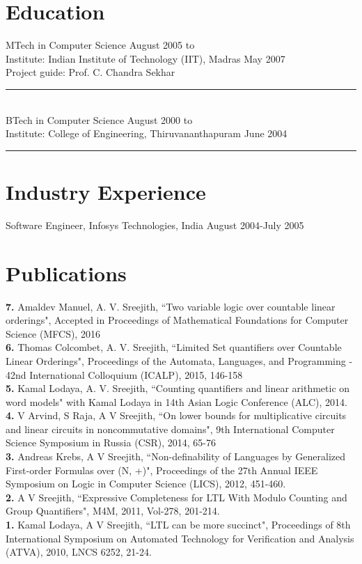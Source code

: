 \documentclass[margin]{res}
\begin{document}
\begin{resume}
\section{Education} 
					MTech in Computer Science \hfill August 2005 to \\
					Institute: Indian Institute of Technology (IIT), Madras \hfill May 2007 \\
					Project guide: Prof. C. Chandra Sekhar \\
					\noindent\rule{13cm}{0.4pt} \\
					BTech in Computer Science \hfill August 2000 to \\
					Institute: College of Engineering, Thiruvananthapuram \hfill June 2004 \\
					\noindent\rule{13cm}{0.4pt} 

\section{Industry Experience}
Software Engineer, Infosys Technologies, India \hfill August 2004-July 2005
 
\section{Publications}
{\bf 7.} Amaldev Manuel, A. V. Sreejith, ``Two variable logic over countable linear orderings", Accepted in Proceedings of Mathematical Foundations for Computer Science (MFCS), 2016 \\
{\bf 6.} Thomas Colcombet, A. V. Sreejith, ``Limited Set quantifiers over Countable Linear Orderings", Proceedings of the Automata, Languages, and Programming
- 42nd International Colloquium (ICALP), 2015, 146-158 \\
{\bf 5.} Kamal Lodaya, A. V. Sreejith, ``Counting quantifiers and linear arithmetic on word models" with Kamal Lodaya in 14th Asian Logic Conference (ALC), 2014. \\
{\bf 4.} V Arvind, S Raja, A V Sreejith, ``On lower bounds for multiplicative circuits and linear circuits in noncommutative domains", 9th International Computer Science Symposium in Russia (CSR), 2014, 65-76\\
{\bf 3.} Andreas Krebs, A V Sreejith, ``Non-definability of Languages by Generalized First-order Formulas over (N, +)", Proceedings of the 27th Annual IEEE Symposium on Logic in Computer Science (LICS), 2012, 451-460.\\
{\bf 2.} A V Sreejith, ``Expressive Completeness for LTL With Modulo Counting and Group Quantifiers", M4M, 2011, Vol-278, 201-214.\\
{\bf 1.} Kamal Lodaya, A V Sreejith, ``LTL can be more succinct", Proceedings of 8th International Symposium on Automated Technology for Verification and Analysis (ATVA), 2010, LNCS 6252, 21-24.


\end{resume}
\end{document}
